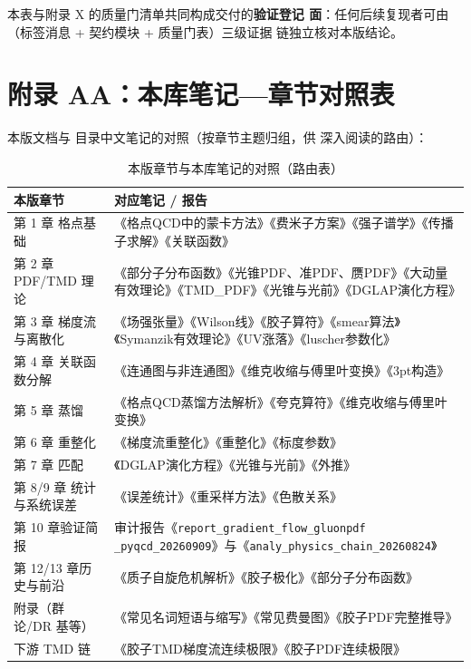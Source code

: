 \documentclass[11pt,a4paper]{ctexart}
\newcommand{\code}[1]{\texttt{#1}}
\newcommand{\pathref}[1]{\path{#1}}
\begin{document}
\noindent 本表与附录 X 的质量门清单共同构成交付的\textbf{验证登记
面}：任何后续复现者可由（标签消息 + 契约模块 + 质量门表）三级证据
链独立核对本版结论。

\section*{附录 AA：本库笔记—章节对照表}

本版文档与 \pathref{docs/} 目录中文笔记的对照（按章节主题归组，供
深入阅读的路由）：

\begin{table}[htbp]
\centering
\caption{本版章节与本库笔记的对照（路由表）}
\footnotesize
\begin{tabularx}{\textwidth}{@{}l >{\raggedright\arraybackslash}X@{}}
\toprule
\textbf{本版章节} & \textbf{对应笔记 / 报告} \\
\midrule
第 1 章 格点基础 & 《格点QCD中的蒙卡方法》《费米子方案》《强子谱学》《传播子求解》《关联函数》 \\
第 2 章 PDF/TMD 理论 & 《部分子分布函数》《光锥PDF、准PDF、赝PDF》《大动量有效理论》《TMD\_PDF》《光锥与光前》《DGLAP演化方程》 \\
第 3 章 梯度流与离散化 & 《场强张量》《Wilson线》《胶子算符》《smear算法》《Symanzik有效理论》《UV涨落》《luscher参数化》 \\
第 4 章 关联函数分解 & 《连通图与非连通图》《维克收缩与傅里叶变换》《3pt构造》 \\
第 5 章 蒸馏 & 《格点QCD蒸馏方法解析》《夸克算符》《维克收缩与傅里叶变换》 \\
第 6 章 重整化 & 《梯度流重整化》《重整化》《标度参数》 \\
第 7 章 匹配 & 《DGLAP演化方程》《光锥与光前》《外推》 \\
第 8/9 章 统计与系统误差 & 《误差统计》《重采样方法》《色散关系》 \\
第 10 章验证简报 & 审计报告《\code{report\_gradient\_flow\_gluonpdf
\_pyqcd\_20260909}》与《\code{analy\_physics\_chain\_20260824}》 \\
第 12/13 章历史与前沿 & 《质子自旋危机解析》《胶子极化》《部分子分布函数》 \\
附录（群论/DR 基等） & 《常见名词短语与缩写》《常见费曼图》《胶子PDF完整推导》 \\
下游 TMD 链 & 《胶子TMD梯度流连续极限》《胶子PDF连续极限》 \\
\bottomrule
\end{tabularx}
\end{table}
\end{document}
